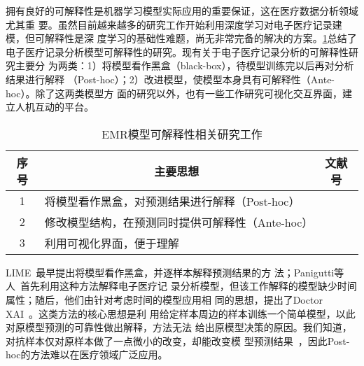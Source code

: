 拥有良好的可解释性是机器学习模型实际应用的重要保证，这在医疗数据分析领域尤其重
要。虽然目前越来越多的研究工作开始利用深度学习对电子医疗记录建模，但可解释性是深
度学习的基础性难题，尚无非常完备的解决的方案。\cref{tab:interpretability}总结了
电子医疗记录分析模型可解释性的研究。现有关于电子医疗记录分析的可解释性研究主要分
为两类：1）将模型看作黑盒（black-box），待模型训练完以后再对分析结果进行解释
（Post-hoc）；2）改进模型，使模型本身具有可解释性（Ante-hoc）。除了这两类模型方
面的研究以外，也有一些工作研究可视化交互界面，建立人机互动的平台。

\begin{table}
    \renewcommand\arraystretch{1.5}
    \begin{small}
        \caption{EMR模型可解释性相关研究工作}
        \label{tab:interpretability}
        \begin{center}
            \begin{tabular}[c]{cll}
                \toprule
                \multicolumn{1}{c}{\textbf{序号}} &
                \multicolumn{1}{c}{\textbf{主要思想}} &
                \multicolumn{1}{c}{\textbf{文献号}}\\
                \midrule
                1 & 将模型看作黑盒，对预测结果进行解释（Post-hoc） & \cite{panigutti2019explaining}
                \cite{panigutti2020doctor} \\
                2 & 修改模型结构，在预测同时提供可解释性（Ante-hoc） &
                \cite{choi2016retain} \cite{ma2017dipole} \cite{bai2018interpretable}
                \cite{gao2019camp} \cite{ma2019adacare} \\
                3 & 利用可视化界面，便于理解 & \cite{kwon2018retainvis} \cite{jin2020carepre}
                \cite{guo2020comparative} \\
                \bottomrule
            \end{tabular}
        \end{center}
    \end{small}
\end{table}

LIME~最早提出将模型看作黑盒，并逐样本解释预测结果的方
法；Panigutti等人~首先利用这种方法解释电子医疗记
录分析模型，但该工作解释的模型缺少时间属性；随后，他们由针对考虑时间的模型应用相
同的思想，提出了Doctor XAI~。这类方法的核心思想是利
用给定样本周边的样本训练一个简单模型，以此对原模型预测的可靠性做出解释，方法无法
给出原模型决策的原因。我们知道，对抗样本仅对原样本做了一点微小的改变，却能改变模
型预测结果~，因此Post-hoc的方法难以在医疗领域广泛应用。

